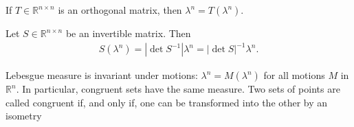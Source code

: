     \begin{theorem}
        If $T\in \mathbb R^{n\times n} $ is an orthogonal matrix, then $\lambda^n = T(\lambda^n).$
    \end{theorem}

    \begin{theorem}
        Let $S\in\mathbb R^{n\times n}$ be an invertible matrix. Then 
        \begin{align}
        S(\lambda^n) = |\det S^{-1}|\lambda^n = |\det S|^{-1}\lambda^n.    
        \end{align}
    \end{theorem}

    \begin{corollary}
        Lebesgue measure is invariant under motions: $\lambda^n=M(\lambda^n)$ for all motions $M$ in $\mathbb R^n$. In particular, congruent sets have the same measure. Two sets of points are called congruent if, and only if, one can be transformed into the other by an isometry
    \end{corollary}